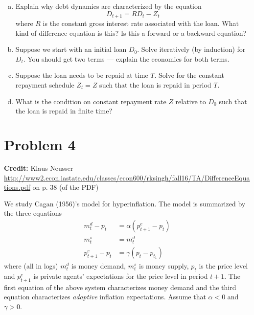 \documentclass[11pt]{extarticle}
\theoremstyle{plain}
\theoremstyle{definition}
\begin{document}
\begin{enumerate}[(a)]
\item Explain why debt dynamics are characterized by the equation
\begin{equation*}
	D_{t+1} = RD_t - Z_t
\end{equation*}
where $R$ is the constant gross interest rate associated with the loan. What kind of difference equation is this? Is this a forward or a backward equation? 

\item Suppose we start with an initial loan $D_0$. Solve iteratively (by induction) for $D_t$. You should get two terms --- explain the economics for both terms.

\item Suppose the loan needs to be repaid at time $T$. Solve for the constant repayment schedule $Z_t = Z$ such that the loan is repaid in period $T$.

\item What is the condition on constant repayment rate $Z$ relative to $D_0$ such that the loan is repaid in finite time? 
\end{enumerate}



\vspace{10mm}
\section*{Problem 4}

\textbf{Credit:} Klaus Neusser \url{http://www2.econ.iastate.edu/classes/econ600/rksingh/fall16/TA/DifferenceEquations.pdf} on p. 38 (of the PDF)

\vspace{5mm}
\noindent
We study Cagan (1956)'s model for hyperinflation. The model is summarized by the three equations
\begin{align*}
	m_t^d - p_t &= \alpha (p_{t+1}^e - p_t) \\
	m_t^s &= m_t^d \\
	p_{t+1}^e - p_t &= \gamma(p_t - p_{t_1})
\end{align*}
where (all in logs) $m_t^d$ is money demand, $m_t^s$ is money supply, $p_t$ is the price level and $p_{t+1}^e$ is private agents' expectations for the price level in period $t+1$. The first equation of the above system characterizes money demand and the third equation characterizes \textit{adaptive} inflation expectations. Assume that $\alpha < 0$ and $\gamma > 0$.
\end{document}

